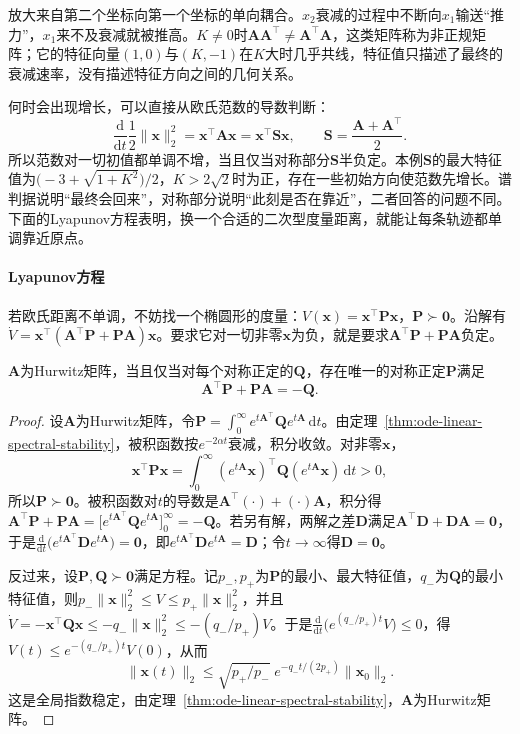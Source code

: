 放大来自第二个坐标向第一个坐标的单向耦合。$x_2$衰减的过程中不断向$x_1$输送“推力”，$x_1$来不及衰减就被推高。$K\neq0$时$\bm A\bm A^\top\neq\bm A^\top\bm A$，这类矩阵称为非正规矩阵；它的特征向量$(1,0)$与$(K,-1)$在$K$大时几乎共线，特征值只描述了最终的衰减速率，没有描述特征方向之间的几何关系。

何时会出现增长，可以直接从欧氏范数的导数判断：
\[
  \frac{\mathrm d}{\mathrm dt}\frac12\|\bm x\|_2^2=\bm x^\top\bm A\bm x=\bm x^\top\bm S\bm x,\qquad\bm S=\frac{\bm A+\bm A^\top}2.
\]
所以范数对一切初值都单调不增，当且仅当对称部分$\bm S$半负定。本例$\bm S$的最大特征值为$\bigl(-3+\sqrt{1+K^2}\bigr)/2$，$K>2\sqrt2$时为正，存在一些初始方向使范数先增长。谱判据说明“最终会回来”，对称部分说明“此刻是否在靠近”，二者回答的问题不同。下面的Lyapunov方程表明，换一个合适的二次型度量距离，就能让每条轨迹都单调靠近原点。

\paragraph{Lyapunov方程}
若欧氏距离不单调，不妨找一个椭圆形的度量：$V(\bm x)=\bm x^\top\bm P\bm x$，$\bm P\succ\bm0$。沿解有$\dot V=\bm x^\top(\bm A^\top\bm P+\bm P\bm A)\bm x$。要求它对一切非零$\bm x$为负，就是要求$\bm A^\top\bm P+\bm P\bm A$负定。

\begin{theorem}[连续时间Lyapunov方程]
  \label{thm:ode-lyapunov-equation}
  $\bm A$为Hurwitz矩阵，当且仅当对每个对称正定的$\bm Q$，存在唯一的对称正定$\bm P$满足
  \begin{equation}
    \bm A^\top\bm P+\bm P\bm A=-\bm Q.
    \label{eq:ode-lyapunov-equation}
  \end{equation}
\end{theorem}

\begin{proof}
  设$\bm A$为Hurwitz矩阵，令$\bm P=\int_0^\infty e^{t\bm A^\top}\bm Qe^{t\bm A}\,\mathrm dt$。由定理~\ref{thm:ode-linear-spectral-stability}，被积函数按$e^{-2\alpha t}$衰减，积分收敛。对非零$\bm x$，
  \[
    \bm x^\top\bm P\bm x=\int_0^\infty(e^{t\bm A}\bm x)^\top\bm Q(e^{t\bm A}\bm x)\,\mathrm dt>0,
  \]
  所以$\bm P\succ\bm0$。被积函数对$t$的导数是$\bm A^\top(\cdot)+(\cdot)\bm A$，积分得$\bm A^\top\bm P+\bm P\bm A=\bigl[e^{t\bm A^\top}\bm Qe^{t\bm A}\bigr]_0^\infty=-\bm Q$。若另有解，两解之差$\bm D$满足$\bm A^\top\bm D+\bm D\bm A=\bm0$，于是$\frac{\mathrm d}{\mathrm dt}\bigl(e^{t\bm A^\top}\bm De^{t\bm A}\bigr)=\bm0$，即$e^{t\bm A^\top}\bm De^{t\bm A}=\bm D$；令$t\to\infty$得$\bm D=\bm0$。

  反过来，设$\bm P,\bm Q\succ\bm0$满足方程。记$p_-,p_+$为$\bm P$的最小、最大特征值，$q_-$为$\bm Q$的最小特征值，则$p_-\|\bm x\|_2^2\leq V\leq p_+\|\bm x\|_2^2$，并且$\dot V=-\bm x^\top\bm Q\bm x\leq-q_-\|\bm x\|_2^2\leq-(q_-/p_+)V$。于是$\frac{\mathrm d}{\mathrm dt}\bigl(e^{(q_-/p_+)t}V\bigr)\leq0$，得$V(t)\leq e^{-(q_-/p_+)t}V(0)$，从而
  \[
    \|\bm x(t)\|_2\leq\sqrt{p_+/p_-}\;e^{-q_-t/(2p_+)}\|\bm x_0\|_2.
  \]
  这是全局指数稳定，由定理~\ref{thm:ode-linear-spectral-stability}，$\bm A$为Hurwitz矩阵。
\end{proof}

